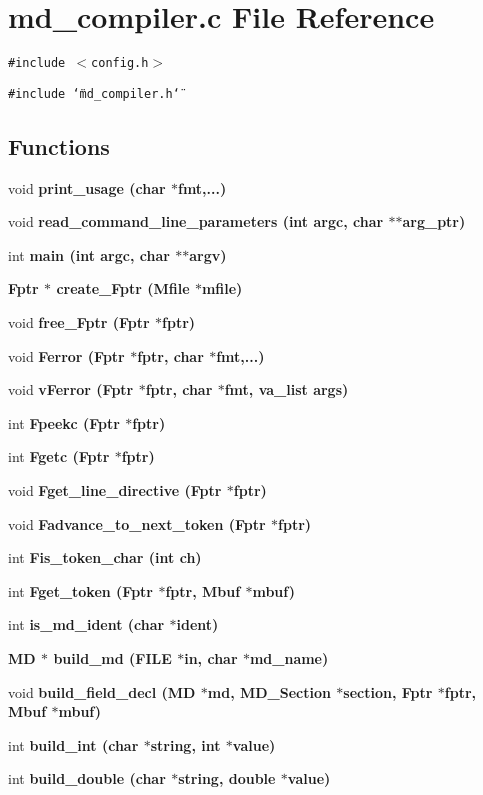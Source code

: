 \section{md\_\-compiler.c File Reference}
\label{md__compiler_8c}
{\tt \#include $<$config.h$>$}\par
{\tt \#include \char`\"{}md\_\-compiler.h\char`\"{}}\par
\subsection*{Functions}
\begin{CompactItemize}
\item 
void \bf{print\_\-usage} (char $\ast$fmt,...)
\item 
void \bf{read\_\-command\_\-line\_\-parameters} (int argc, char $\ast$$\ast$arg\_\-ptr)
\item 
int \bf{main} (int argc, char $\ast$$\ast$argv)
\item 
\bf{Fptr} $\ast$ \bf{create\_\-Fptr} (\bf{Mfile} $\ast$mfile)
\item 
void \bf{free\_\-Fptr} (\bf{Fptr} $\ast$fptr)
\item 
void \bf{Ferror} (\bf{Fptr} $\ast$fptr, char $\ast$fmt,...)
\item 
void \bf{v\-Ferror} (\bf{Fptr} $\ast$fptr, char $\ast$fmt, va\_\-list args)
\item 
int \bf{Fpeekc} (\bf{Fptr} $\ast$fptr)
\item 
int \bf{Fgetc} (\bf{Fptr} $\ast$fptr)
\item 
void \bf{Fget\_\-line\_\-directive} (\bf{Fptr} $\ast$fptr)
\item 
void \bf{Fadvance\_\-to\_\-next\_\-token} (\bf{Fptr} $\ast$fptr)
\item 
int \bf{Fis\_\-token\_\-char} (int ch)
\item 
int \bf{Fget\_\-token} (\bf{Fptr} $\ast$fptr, \bf{Mbuf} $\ast$mbuf)
\item 
int \bf{is\_\-md\_\-ident} (char $\ast$ident)
\item 
\bf{MD} $\ast$ \bf{build\_\-md} (FILE $\ast$in, char $\ast$md\_\-name)
\item 
void \bf{build\_\-field\_\-decl} (\bf{MD} $\ast$md, \bf{MD\_\-Section} $\ast$section, \bf{Fptr} $\ast$fptr, \bf{Mbuf} $\ast$mbuf)
\item 
int \bf{build\_\-int} (char $\ast$string, int $\ast$value)
\item 
int \bf{build\_\-double} (char $\ast$string, double $\ast$value)

\end{CompactItemize}
